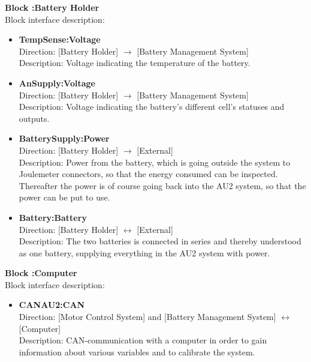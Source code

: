 \textbf{Block :Battery Holder}\\
Block interface description:
\begin{itemize}
	\item \textbf{TempSense:Voltage}\\
	Direction: [Battery Holder] $\rightarrow$ [Battery Management System]\\
	Description: Voltage indicating the temperature of the battery.
	\item \textbf{AnSupply:Voltage}\\
	Direction: [Battery Holder] $\rightarrow$ [Battery Management System]\\
	Description: Voltage indicating the battery's different cell's statuses and outputs.
	\item \textbf{BatterySupply:Power}\\
	Direction: [Battery Holder] $\rightarrow$ [External]\\
	Description: Power from the battery, which is going outside the system to Joulemeter connectors, so that the energy consumed can be inspected. Thereafter the power is of course going back into the AU2 system, so that the power can be put to use.
	\item \textbf{Battery:Battery}\\
	Direction: [Battery Holder] $\leftrightarrow$ [External]\\
	Description: The two batteries is connected in series and thereby understood as one battery, supplying everything in the AU2 system with power.
\end{itemize}

\textbf{Block :Computer}\\
Block interface description:
\begin{itemize}
	\item \textbf{CANAU2:CAN}\\
	Direction: [Motor Control System] and [Battery Management System] $\leftrightarrow$ [Computer]\\
	Description: CAN-communication with a computer in order to gain information about various variables and to calibrate the system.
\end{itemize}